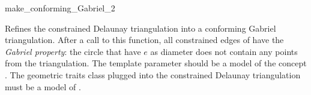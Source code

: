 \begin{ccRefFunction}{make_conforming_Gabriel_2}


{ Refines the constrained Delaunay triangulation  into a
  conforming Gabriel triangulation. After a call to this function, all
  constrained edges of  have the \emph{Gabriel property}: the
  circle that have $e$ as diameter does not contain any points from
  the triangulation.  
  \ccPrecond The template parameter  should be a model of the
  concept . The geometric
  traits class plugged into the constrained Delaunay triangulation must be a
  model of .} 

\end{ccRefFunction}

